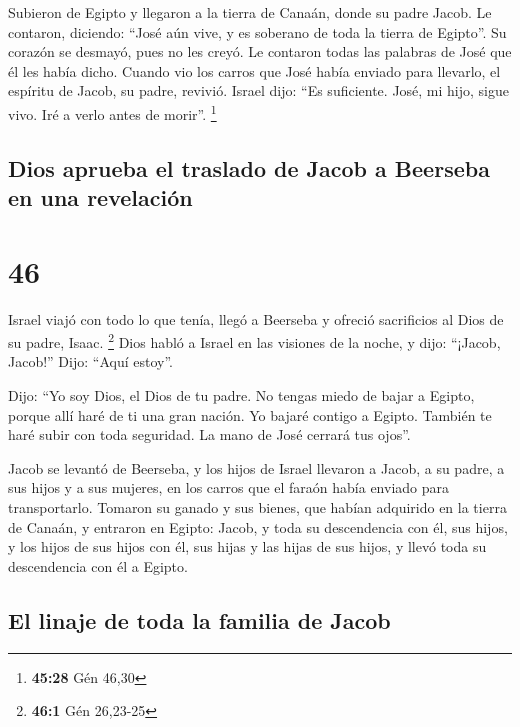  Subieron de Egipto y llegaron a la tierra de Canaán,
donde su padre Jacob.  Le contaron, diciendo: ``José aún
vive, y es soberano de toda la tierra de Egipto''. Su corazón se
desmayó, pues no les creyó.  Le contaron todas las
palabras de José que él les había dicho. Cuando vio los carros que José
había enviado para llevarlo, el espíritu de Jacob, su padre, revivió.
 Israel dijo: ``Es suficiente. José, mi hijo, sigue vivo.
Iré a verlo antes de morir''. \footnote{\textbf{45:28} Gén 46,30}

\hypertarget{dios-aprueba-el-traslado-de-jacob-a-beerseba-en-una-revelaciuxf3n}{%
\subsection{Dios aprueba el traslado de Jacob a Beerseba en una
revelación}\label{dios-aprueba-el-traslado-de-jacob-a-beerseba-en-una-revelaciuxf3n}}

\hypertarget{section-45}{%
\section{46}\label{section-45}}

 Israel viajó con todo lo que tenía, llegó a Beerseba y
ofreció sacrificios al Dios de su padre, Isaac. \footnote{\textbf{46:1}
  Gén 26,23-25}  Dios habló a Israel en las visiones de la
noche, y dijo: ``¡Jacob, Jacob!'' Dijo: ``Aquí estoy''.

 Dijo: ``Yo soy Dios, el Dios de tu padre. No tengas miedo
de bajar a Egipto, porque allí haré de ti una gran nación.
 Yo bajaré contigo a Egipto. También te haré subir con
toda seguridad. La mano de José cerrará tus ojos''.

 Jacob se levantó de Beerseba, y los hijos de Israel
llevaron a Jacob, a su padre, a sus hijos y a sus mujeres, en los carros
que el faraón había enviado para transportarlo.  Tomaron
su ganado y sus bienes, que habían adquirido en la tierra de Canaán, y
entraron en Egipto: Jacob, y toda su descendencia con él, 
sus hijos, y los hijos de sus hijos con él, sus hijas y las hijas de sus
hijos, y llevó toda su descendencia con él a Egipto.

\hypertarget{el-linaje-de-toda-la-familia-de-jacob}{%
\subsection{El linaje de toda la familia de
Jacob}\label{el-linaje-de-toda-la-familia-de-jacob}}

